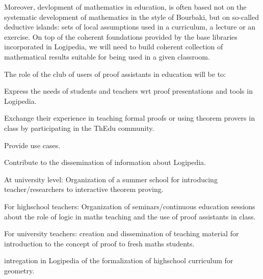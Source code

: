 \begin{workpackage}[id=dissemination,wphases=0-48,type=MGT,
  short=Dissemination,%
  title={Dissemination, communication and exploitation},
  lead=Inr]
\begin{tasklist}
\begin{task}[id=teachers-club,
      title=Expanding the use of Logipedia in education,
      lead=Str,StrRM=2]
    Moreover, devlopment of mathematics in education, is often based
    not on the systematic development of mathematics in the style of
    Bourbaki, but on so-called deductive islands: sets of local
    assumptions used in a curriculum, a lecture or an exercise.  On
    top of the coherent foundations provided by the base libraries
    incorporated in Logipedia, we will need to build coherent
    collection of mathematical results suitable for being used in a
    given classroom.

    The role of the club of users of proof assistants in education will be to:
    \begin{compactitem}
    \item Express the needs of students and teachers wrt proof
      presentations and tools in Logipedia.
    \item Exchange their experience in teaching formal proofs or using
      theorem provers in class by participating in the ThEdu community.
    \item Provide use cases.
    \item Contribute to the dissemination of information about Logipedia.
    \end{compactitem}



\begin{wpdelivs}
\begin{wpdeliv}[due=18,miles=???,id=summerschool,dissem=PU,nature=other,lead=Sac]{At university level: Organization of a summer school for introducing teacher/researchers to interactive theorem proving.}
\end{wpdeliv}
\begin{wpdeliv}[due=18,miles=???,id=continuoused,dissem=PU,nature=other,lead=Str]{
 For highschool teachers: Organization of seminars/continuous education sessions about the role of logic in maths teaching and the use of proof assistants in class.}
\end{wpdeliv}
\begin{wpdeliv}[due=18,miles=???,id=course-proof,dissem=PU,nature=other,lead=Str]{ For university teachers: creation and dissemination of teaching material for introduction to the concept of proof to fresh maths students.}
\end{wpdeliv}
\begin{wpdeliv}[due=18,miles=???,id=geom-curriculum,dissem=PU,nature=other,lead=Str]{ intregation in Logipedia of the formalization of highschool curriculum for geometry.}
\end{wpdeliv}
\end{wpdelivs}


\end{task}
\end{tasklist}
\end{workpackage}
